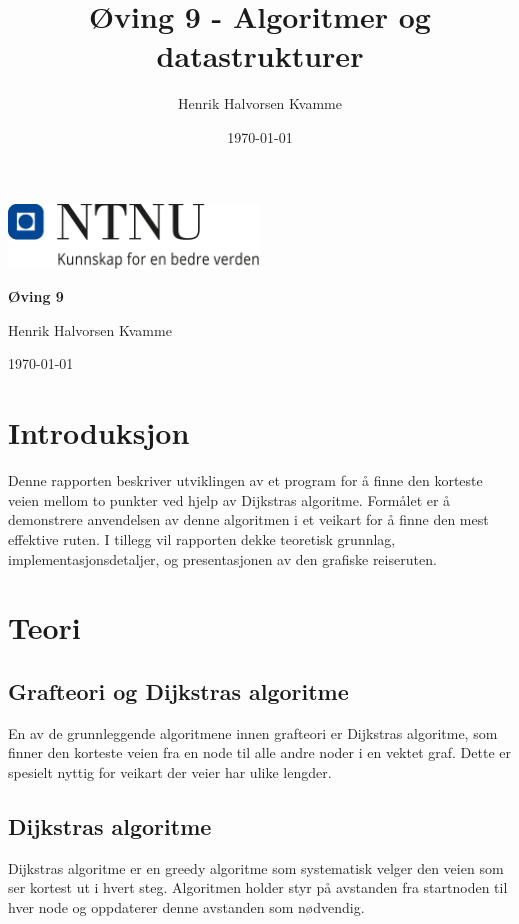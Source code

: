 \documentclass[12pt,a4paper]{article}
\title{Øving 9 - Algoritmer og datastrukturer}
\author{Henrik Halvorsen Kvamme}
\date{\today}
\begin{document}
\begin{center}
    \includegraphics[width=0.5\textwidth]{../images/NTNU_Logo.png}
    
    \vspace{1.5em}  %
    
    {\LARGE \textbf{Øving 9} \\[0.5em] }  %
    \vspace{1em}  %
    
    {\large Henrik Halvorsen Kvamme}\\  %
    \vspace{0.5em}  %
    
    {\today}  %
\end{center}

\vspace{2em}

\tableofcontents

\newpage

\section{Introduksjon}
Denne rapporten beskriver utviklingen av et program for å finne den korteste veien mellom to punkter ved hjelp av Dijkstras algoritme. Formålet er å demonstrere anvendelsen av denne algoritmen i et veikart for å finne den mest effektive ruten. I tillegg vil rapporten dekke teoretisk grunnlag, implementasjonsdetaljer, og presentasjonen av den grafiske reiseruten.

\section{Teori}
\subsection{Grafteori og Dijkstras algoritme}
En av de grunnleggende algoritmene innen grafteori er Dijkstras algoritme, som finner den korteste veien fra en node til alle andre noder i en vektet graf. Dette er spesielt nyttig for veikart der veier har ulike lengder.

\subsection{Dijkstras algoritme}
Dijkstras algoritme er en greedy algoritme som systematisk velger den veien som ser kortest ut i hvert steg. Algoritmen holder styr på avstanden fra startnoden til hver node og oppdaterer denne avstanden som nødvendig.
\end{document}
